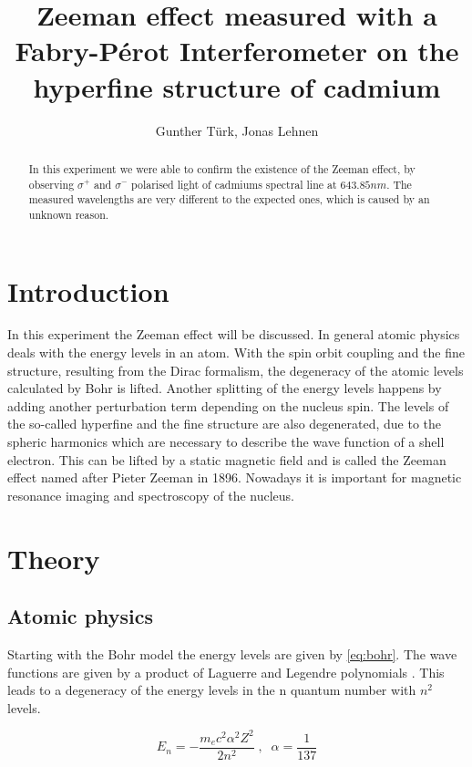 \documentclass[]{article}
\title{Zeeman effect measured with a Fabry-Pérot Interferometer on the hyperfine structure of cadmium}
\author{Gunther T\"urk, Jonas Lehnen}
\begin{document}
\maketitle
\begin{abstract}
In this experiment we were able to confirm the existence of the Zeeman effect, by observing $\sigma^+$ and $\sigma^-$ polarised light of cadmiums spectral line at $643.85nm$. The measured wavelengths are very different to the expected ones, which is caused by an unknown reason.
\end{abstract}

\newpage
\tableofcontents

\newpage
\section{Introduction}
In this experiment the Zeeman effect will be discussed. In general atomic physics deals with the energy levels in an atom. With the spin orbit coupling and the fine structure, resulting from the Dirac formalism, the degeneracy of the atomic levels calculated by Bohr is lifted. Another splitting of the energy levels happens by adding another perturbation term depending on the nucleus spin. The levels of the so-called hyperfine and the fine structure are also degenerated, due to the spheric harmonics which are necessary to describe the wave function of a shell electron. This can be lifted by a static magnetic field and is called the Zeeman effect named after Pieter Zeeman in 1896.
Nowadays it is important for magnetic resonance imaging and spectroscopy of the nucleus.



\section{Theory}
\subsection{Atomic physics}
Starting with the Bohr model the energy levels are given by \autoref{eq:bohr}. The wave functions are given by a product of Laguerre and Legendre polynomials \cite{dem3}. This leads to a degeneracy of the energy levels in the n quantum number with $n^2$ levels. 

\begin{equation}
E_n = -\frac{m_ec^2\alpha^2Z^2}{2n^2} \;,\;\; \alpha=\frac{1}{137}
\label{eq:bohr}
\end{equation}
\end{document}
